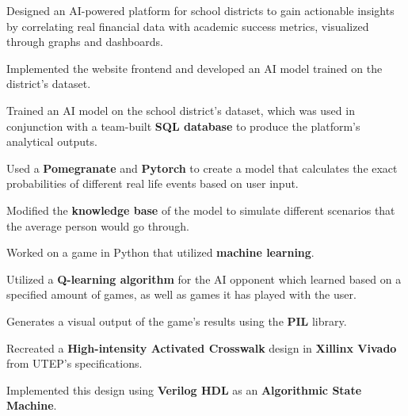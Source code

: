 \documentclass[letterpaper,10pt]{article}
\begin{document}
\vspace{0pt}
\begin{resume_list}
  \vspace{2pt}
    \item Designed an AI-powered platform for school districts to gain actionable insights by correlating real financial data with academic success metrics, visualized through graphs and dashboards.
    \vspace{1pt}
    \item Implemented the website frontend and developed an AI model trained on the district's dataset.
    \item Trained an AI model on the school district's dataset, which was used in conjunction with a team-built \textbf{SQL database} to produce the platform's analytical outputs.
\end{resume_list}

\vspace{0pt}
\begin{resume_list}
  \vspace{2pt}
    \item Used a \textbf{Pomegranate} and \textbf{Pytorch} to create a model that calculates the exact probabilities of different real life events based on user input.
    \vspace{1pt}
    \item Modified the \textbf{knowledge base} of the model to simulate different scenarios that the average person would go through.
\end{resume_list}

\vspace{0pt}
\begin{resume_list}
  \item Worked on a game in Python that utilized \textbf{machine learning}.
  \vspace{1pt}
  \item Utilized a \textbf{Q-learning algorithm} for the AI opponent which learned based on a specified amount of games, as well as games it has played with the user.
  \vspace{1pt}
  \item Generates a visual output of the game's results using the \textbf{PIL} library.
\end{resume_list}

\vspace{0pt}
\begin{resume_list}
  \item Recreated a \textbf{High-intensity Activated Crosswalk} design in \textbf{Xillinx Vivado} from UTEP's specifications.
  \vspace{1pt}
  \item Implemented this design using \textbf{Verilog HDL} as an \textbf{Algorithmic State Machine}.
\end{resume_list}
\end{document}
